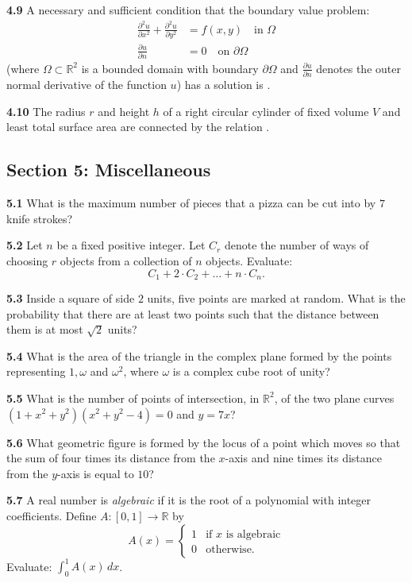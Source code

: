 \documentclass[11pt,a4paper]{article}
\newcommand{\R}{\mathbb{R}}
\newcommand{\examsec}[1]{%
  \subsection*{#1}
  \vspace{-2pt}
}
\newcommand{\qitem}[1]{\par\medskip\noindent\textbf{#1}\hspace{0.5em}}
\begin{document}
\qitem{4.9} A necessary and sufficient condition that the boundary value problem:
\begin{align*}
  \frac{\partial^2 u}{\partial x^2} + \frac{\partial^2 u}{\partial y^2} &= f(x, y) \quad \text{in } \Omega \\
  \frac{\partial u}{\partial n} &= 0 \quad \text{on } \partial\Omega
\end{align*}
(where $\Omega \subset \R^2$ is a bounded domain with boundary $\partial\Omega$ and $\frac{\partial u}{\partial n}$ denotes the outer normal derivative of the function $u$) has a solution is \underline{\hspace{2cm}}.

\qitem{4.10} The radius $r$ and height $h$ of a right circular cylinder of fixed volume $V$ and least total surface area are connected by the relation \underline{\hspace{2cm}}.

\examsec{Section 5: Miscellaneous}

\qitem{5.1} What is the maximum number of pieces that a pizza can be cut into by $7$ knife strokes?

\qitem{5.2} Let $n$ be a fixed positive integer. Let $C_r$ denote the number of ways of choosing $r$ objects from a collection of $n$ objects. Evaluate:
\[
  C_1 + 2\cdot C_2 + \dots + n\cdot C_n.
\]

\qitem{5.3} Inside a square of side $2$ units, five points are marked at random. What is the probability that there are at least two points such that the distance between them is at most $\sqrt{2}$ units?

\qitem{5.4} What is the area of the triangle in the complex plane formed by the points representing $1, \omega$ and $\omega^2$, where $\omega$ is a complex cube root of unity?

\qitem{5.5} What is the number of points of intersection, in $\R^2$, of the two plane curves $(1 + x^2 + y^2)(x^2 + y^2 - 4) = 0$ and $y = 7x$?

\qitem{5.6} What geometric figure is formed by the locus of a point which moves so that the sum of four times its distance from the $x$-axis and nine times its distance from the $y$-axis is equal to $10$?

\qitem{5.7} A real number is \emph{algebraic} if it is the root of a polynomial with integer coefficients. Define $A : [0, 1] \to \R$ by
\[
  A(x) = \begin{cases} 1 & \text{if } x \text{ is algebraic} \\ 0 & \text{otherwise.} \end{cases}
\]
Evaluate: $\int_0^1 A(x)\,dx$.
\end{document}
